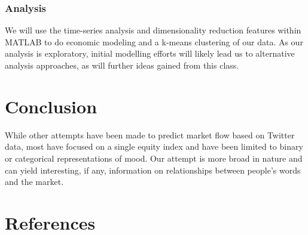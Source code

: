 \documentclass[titlepage]{article}\usepackage[]{graphicx}\usepackage[]{color}
\begin{document}
\subsubsection{Analysis}
We will use the time-series analysis and dimensionality reduction features within MATLAB to do economic modeling and a k-means clustering of our data. As our analysis is exploratory, initial modelling efforts will likely lead us to alternative analysis approaches, as will further ideas gained from this class. 


\section{Conclusion}
While other attempts have been made to predict market flow based on Twitter data, most have focused on a single equity index and have been limited to binary or categorical representations of mood. Our attempt is more broad in nature and can yield interesting, if any, information on relationships between people’s words and the market. 


\section{References}
\end{document}
